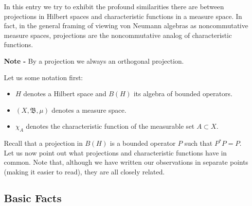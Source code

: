 \documentclass[12pt]{article}
\begin{document}

In this entry we try to exhibit the profound similarities there are between projections in Hilbert spaces and characteristic functions in a measure space. In fact, in the general framing of viewing von Neumann algebras as noncommutative measure spaces, projections are the noncommutative analog of characteristic functions.

{\bf Note -} By a projection we always  an orthogonal projection.

Let us  some notation first:
\begin{itemize}
\item $H$ denotes a Hilbert space and $B(H)$ its algebra of bounded operators.
\item $(X, \mathfrak{B}, \mu)$ denotes a measure space.
\item $\chi_A$ denotes the characteristic function of the measurable set $A \subset X$.
\end{itemize}

Recall that a projection in $B(H)$ is a bounded operator $P$ such that $P^*P = P$. Let us now point out what projections and characteristic functions have in common. Note that, although we have written our observations in separate points (making it easier to read), they are all closely related.

\subsection{Basic Facts}
\end{document}
